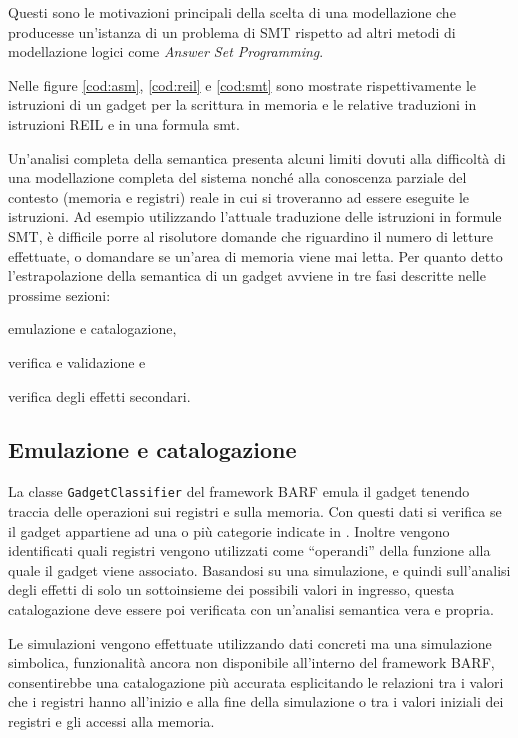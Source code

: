 Questi sono le motivazioni principali della scelta di una modellazione
che producesse un'istanza di un problema di SMT rispetto ad altri
metodi di modellazione logici come \emph{Answer Set Programming}.

Nelle figure \ref{cod:asm}, \ref{cod:reil} e \ref{cod:smt} sono
mostrate rispettivamente le istruzioni di un gadget per la scrittura
in memoria e le relative traduzioni in istruzioni REIL e in una
formula smt.

Un'analisi completa della semantica presenta alcuni limiti dovuti alla
difficoltà di una modellazione completa del sistema nonché alla
conoscenza parziale del contesto (memoria e registri) reale in cui si
troveranno ad essere eseguite le istruzioni. Ad esempio utilizzando
l'attuale traduzione delle istruzioni in formule SMT, è difficile
porre al risolutore domande che riguardino il numero di letture
effettuate, o domandare se un'area di memoria viene mai letta. Per
quanto detto l'estrapolazione della semantica di un gadget avviene in
tre fasi descritte nelle prossime sezioni:
\begin{inparaenum}[a)]
\item emulazione e catalogazione, 
\item verifica e validazione e 
\item verifica degli effetti secondari.
\end{inparaenum}



\subsection{Emulazione e catalogazione}
La classe \lstinline{GadgetClassifier} del framework BARF emula il
gadget tenendo traccia delle operazioni sui registri e sulla
memoria. Con questi dati si verifica se il gadget appartiene ad una o
più categorie indicate in \cite{schwartz-2011}.
Inoltre vengono identificati quali registri vengono utilizzati come
``operandi'' della funzione alla quale il gadget viene
associato. Basandosi su una simulazione, e quindi sull'analisi degli
effetti di solo un sottoinsieme dei possibili valori in ingresso,
questa catalogazione deve essere poi verificata con un'analisi
semantica vera e propria.

Le simulazioni vengono effettuate utilizzando dati concreti ma una
simulazione simbolica, funzionalità ancora non disponibile all'interno
del framework BARF, consentirebbe una catalogazione più accurata
esplicitando le relazioni tra i valori che i registri hanno all'inizio
e alla fine della simulazione o tra i valori iniziali dei registri e
gli accessi alla memoria.

